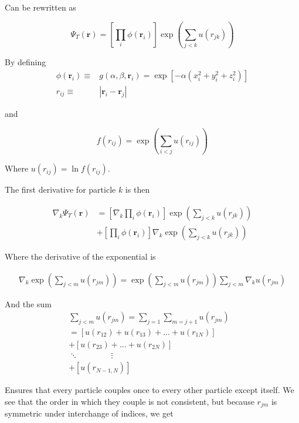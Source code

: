 \documentclass[
    a4paper, aps, twocolumn, floatfix, superscriptaddress,
    nofootinbib]{revtex4-1}
\begin{document}
\begin{appendices}
Can be rewritten as 

\begin{equation}
    \Psi_T(\boldsymbol{r}) = \left[\prod_i \phi(\boldsymbol{r}_i)\right] \exp \left(\sum_{j<k} u(r_{jk})\right)
\end{equation}

By defining 
\begin{align*}
     \phi(\boldsymbol{r}_i) \equiv & g(\alpha, \beta, \boldsymbol{r}_i) =  \exp[-\alpha(x_i^2 + y_i^2 + z_i^2)]  \\
    r_{ij} \equiv& |\boldsymbol{r}_i - \boldsymbol{r}_j|
\end{align*}


and 

\begin{equation*}
    f(r_{ij}) = \exp \left(\sum_{i<j} u(r_{ij})\right)
\end{equation*}

Where $u(r_{ij}) = \ln{f(r_{ij})}$. 

The first derivative for particle $k$ is then 

\begin{align}
    \nabla_k \Psi_T(\boldsymbol{r}) &= \left[\nabla_k \prod_i \phi(\boldsymbol{r}_i)\right]\exp\left(\sum_{j<k} u(r_{jk})\right) \nonumber \\ 
    &+ \left[\prod_i \phi(\boldsymbol{r}_i)\right]\nabla_k \exp\left(\sum_{j<k} u(r_{jk})\right) 
\end{align}


Where the derivative of the exponential is

\begin{align*}
    \nabla_k \exp\left(\sum_{j<m} u(r_{jm})\right) = \exp\left(\sum_{j<m} u(r_{jm})\right)  \sum_{j < m} \nabla_k u(r_{jm}) 
\end{align*}

And the sum 
\begin{align*}
    \sum_{j<m} u(r_{jm}) =\sum_{j=1}\sum_{m=j+1} u(r_{jm})& \\
    = \left[u(r_{12})+u(r_{13})+...+u(r_{1N})\right]& \\
    + \left[u(r_{23})+...+u(r_{2N})\right]&\\
     \ddots \qquad \qquad \vdots \qquad&\\
    +\left[u(r_{N-1,N})\right]
\end{align*}

Ensures that every particle couples once to every other particle except itself. We see that the order in which they couple is not consistent, but because $r_{jm}$ is symmetric under interchange of indices, we get 


\end{appendices}
\end{document}
